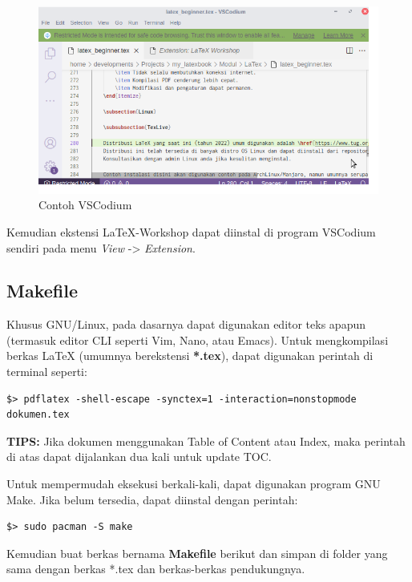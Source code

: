 \documentclass{book} %
\begin{document}
	\begin{figure}[!ht]
		\centering
		\includegraphics[width=400pt]{images/vscodium}
		\caption{Contoh VSCodium}
	\end{figure}

	Kemudian ekstensi LaTeX-Workshop dapat diinstal di program VSCodium sendiri pada menu \textit{View} -> \textit{Extension}.

	\newpage
	\subsection{Makefile}

	Khusus GNU/Linux, pada dasarnya dapat digunakan editor teks apapun (termasuk editor CLI seperti Vim, Nano, atau Emacs).
	Untuk mengkompilasi berkas \LaTeX{} (umumnya berekstensi \textbf{*.tex}), dapat digunakan perintah di terminal seperti:

	\begin{verbatim}
$> pdflatex -shell-escape -synctex=1 -interaction=nonstopmode dokumen.tex
	\end{verbatim}

	\textbf{TIPS:} Jika dokumen menggunakan Table of Content atau Index, maka perintah di atas dapat dijalankan dua kali untuk update TOC.

	Untuk mempermudah eksekusi berkali-kali, dapat digunakan program GNU Make.
	Jika belum tersedia, dapat diinstal dengan perintah:

	\begin{verbatim}
$> sudo pacman -S make
	\end{verbatim}

	Kemudian buat berkas bernama \textbf{Makefile} berikut dan simpan di folder yang sama dengan berkas *.tex dan berkas-berkas pendukungnya.
\end{document}
